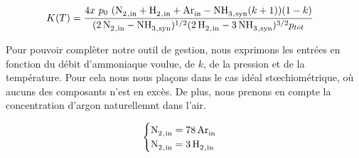 \begin{align}
 K(T) & = \frac{4x~p_0~(\ce{N2_{,in} + H2_{,in} + Ar_{in}} - \ce{NH3_{,syn}}(k + 1)) (1 - k)}{(\ce{2N2_{,in} - NH3_{,syn}})^{1/2} (\ce{2H2_{,in} - 3NH3_{,syn}})^{3/2} p_{tot}}
 \label{eq:finale}
\end{align}

Pour pouvoir complèter notre outil de gestion, nous exprimons les entrées en fonction du débit d'ammoniaque voulue, de $k$, de la pression et de la température. Pour cela nous nous plaçons dans le cas idéal stœchiométrique, où aucuns des composants n'est en excès. De plus, nous prenons en compte la concentration d'argon naturellemnt dans l'air. 
 
$$
\begin{cases}
 \ce{N2_{,in}} = \ce{78Ar_{in}}\\ 
 \ce{N2_{,in}} = \ce{3H2_{,in}} \\
\end{cases}
$$


